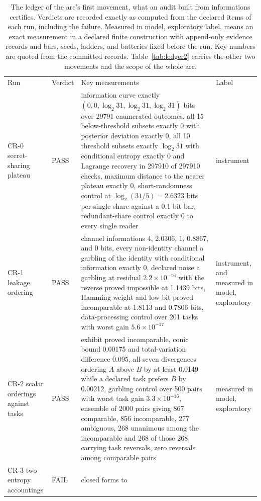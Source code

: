 \documentclass[aps,pre,reprint,nofootinbib]{revtex4-2}
\begin{document}
\begin{table}[t]
\caption{The ledger of the arc's first movement, what an audit built
from informations certifies.  Verdicts are recorded exactly as
computed from the declared items of each run, including the failure.
Measured in model, exploratory label, means an exact measurement in a
declared finite construction with append-only evidence records and
bars, seeds, ladders, and batteries fixed before the run.  Key numbers
are quoted from the committed records.  Table~\ref{tab:ledger2}
carries the other two movements and the scope of the whole arc.}
\label{tab:ledger}
\begin{ruledtabular}
\footnotesize
\begin{tabular}{L{2.6cm}lL{9.6cm}L{2.9cm}}
Run & Verdict & Key measurements & Label \\
\colrule
CR-0 secret-sharing plateau & PASS & information curve exactly $(0, 0,
\log_2 31, \log_2 31, \log_2 31)$ bits over 29791 enumerated
outcomes, all 15 below-threshold subsets exactly 0 with posterior
deviation exactly 0, all 10 threshold subsets exactly $\log_2 31$ with
conditional entropy exactly 0 and Lagrange recovery in 297910 of
297910 checks, maximum distance to the nearer plateau exactly 0,
short-randomness control at $\log_2(31/5) = 2.6323$ bits per single
share against a 0.1 bit bar, redundant-share control exactly 0 to
every single reader & instrument \\
CR-1 leakage ordering & PASS & channel informations 4, 2.0306, 1,
0.8867, and 0 bits, every non-identity channel a garbling of the
identity with conditional information exactly 0, declared noise a
garbling at residual $2.2\times10^{-16}$ with the reverse proved
impossible at 1.1439 bits, Hamming weight and low bit proved
incomparable at 1.8113 and 0.7806
bits, data-processing control over 201 tasks with worst gain
$5.6\times10^{-17}$ & instrument, and measured in model, exploratory \\
CR-2 scalar orderings against tasks & PASS & exhibit proved
incomparable, conic bound 0.00175 and total-variation difference
0.095, all seven divergences ordering $A$ above $B$ by at least
0.0149 while a declared task prefers $B$ by 0.00212,
garbling control over 500 pairs with worst task gain
$3.3\times10^{-16}$, ensemble of 2000 pairs giving 867 comparable,
856 incomparable, 277 ambiguous, 268 unanimous among the
incomparable and 268 of those 268 carrying task reversals, zero
reversals among comparable pairs &
measured in model, exploratory \\
CR-3 two entropy accountings & FAIL & closed forms to

\end{tabular}
\end{ruledtabular}
\end{table}
\end{document}
